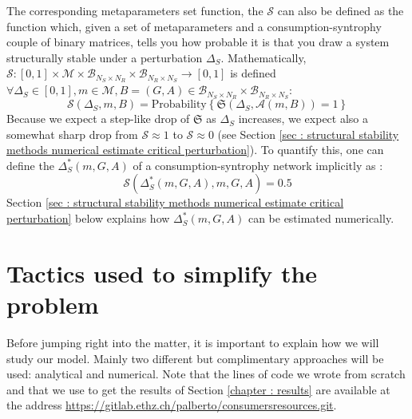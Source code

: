 \documentclass[12pt, titlepage]{report}
\begin{document}
The corresponding metaparameters set function, the  $\mathcal{S}$
can also be defined as the function which, given a set of metaparameters and a consumption-syntrophy couple of binary matrices, tells you how probable it is that you draw a system structurally stable under a perturbation $\Delta_S$. Mathematically, $\mathcal{S} : [0,1] \times \mathcal{M} \times \mathcal{B}_{N_S \times N_R} \times \mathcal{B}_{N_R \times N_S} \rightarrow [0,1]$ is defined $\forall \Delta_S \in [0,1], m \in \mathcal{M}, B=(G,A) \in \mathcal{B}_{N_S \times N_R} \times \mathcal{B}_{N_R \times N_S}$:
\begin{equation}
{
\mathcal{S}(\Delta_S, m, B)= \text{Probability}\left\{\mathfrak{S}(\Delta_S, \mathcal{A}(m, B))=1\right\}
}
\end{equation}
Because we expect a step-like drop of $\mathfrak{S}$ as $\Delta_S$ increases, we expect also a somewhat sharp drop from $\mathcal{S} \approx 1$ to $\mathcal{S} \approx 0$ (see Section \ref{sec : structural stability methods numerical estimate critical perturbation}). To quantify this, one can define the  $\Delta_S^*(m,G,A)$ of a consumption-syntrophy network implicitly as :
\begin{equation}
\mathcal{S}(\Delta_S^*(m, G, A), m, G,A)=0.5
\end{equation}
Section \ref{sec : structural stability methods numerical estimate critical perturbation} below explains how $\Delta_S^*(m, G,A)$ can be estimated numerically.


\newpage
\section{Tactics used to simplify the problem}\label{sec: tactics used to simplify the problem}
Before jumping right into the matter, it is important to explain how we will study our model. Mainly two different but complimentary approaches will be used: analytical and numerical. Note that the %
lines of code we wrote from scratch and that we use to get the results of Section \ref{chapter : results} are available at the address \url{https://gitlab.ethz.ch/palberto/consumersresources.git}.
\end{document}
